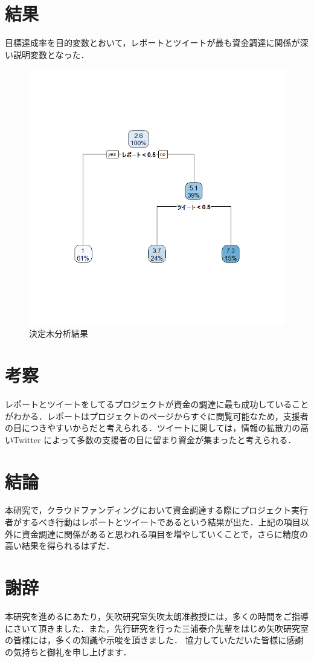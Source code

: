 \chapter{結果}
目標達成率を目的変数とおいて，レポートとツイートが最も資金調達に関係が深い説明変数となった．

\begin{figure}[H]
\centering
\includegraphics[width=12cm]{ket.PNG}
\caption{決定木分析結果}\label{サンプル図}
\end{figure}
\chapter{考察}
レポートとツイートをしてるプロジェクトが資金の調達に最も成功していることがわかる．レポートはプロジェクトのページからすぐに閲覧可能なため，支援者の目につきやすいからだと考えられる．ツイートに関しては，情報の拡散力の高いTwitter によって多数の支援者の目に留まり資金が集まったと考えられる．


\chapter{結論}
本研究で，クラウドファンディングにおいて資金調達する際にプロジェクト実行者がするべき行動はレポートとツイートであるという結果が出た．上記の項目以外に資金調達に関係があると思われる項目を増やしていくことで，さらに精度の高い結果を得られるはずだ．









\chapter*{謝辞}
本研究を進めるにあたり，矢吹研究室矢吹太朗准教授には，多くの時間をご指導にさいて頂きました．また，先行研究を行った三浦泰介先輩をはじめ矢吹研究室の皆様には，多くの知識や示唆を頂きました．
協力していただいた皆様に感謝の気持ちと御礼を申し上げます．


